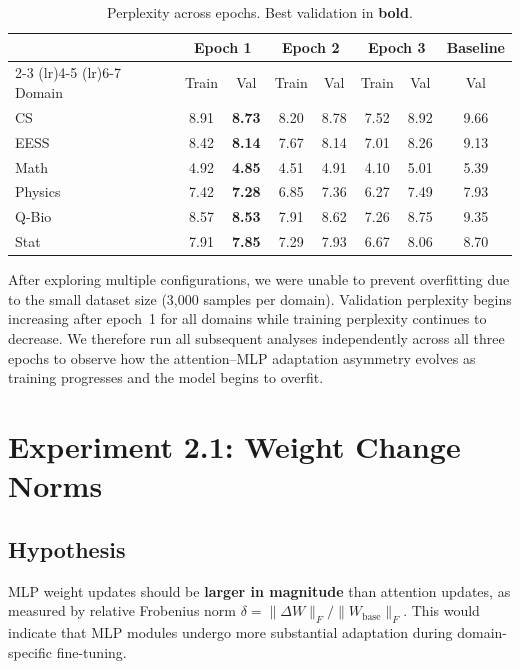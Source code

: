 \documentclass[11pt,a4paper]{article}
\begin{document}
\begin{table}[H]
\centering
\caption{Perplexity across epochs. Best validation in \textbf{bold}.}
\label{tab:perplexity}
\small
\begin{tabular}{l cc cc cc c}
\toprule
& \multicolumn{2}{c}{Epoch 1} & \multicolumn{2}{c}{Epoch 2} & \multicolumn{2}{c}{Epoch 3} & Baseline \\
\cmidrule(lr){2-3} \cmidrule(lr){4-5} \cmidrule(lr){6-7}
Domain & Train & Val & Train & Val & Train & Val & Val \\
\midrule
CS      & 8.91 & \textbf{8.73} & 8.20 & 8.78 & 7.52 & 8.92 & 9.66 \\
EESS    & 8.42 & \textbf{8.14} & 7.67 & 8.14 & 7.01 & 8.26 & 9.13 \\
Math    & 4.92 & \textbf{4.85} & 4.51 & 4.91 & 4.10 & 5.01 & 5.39 \\
Physics & 7.42 & \textbf{7.28} & 6.85 & 7.36 & 6.27 & 7.49 & 7.93 \\
Q-Bio   & 8.57 & \textbf{8.53} & 7.91 & 8.62 & 7.26 & 8.75 & 9.35 \\
Stat    & 7.91 & \textbf{7.85} & 7.29 & 7.93 & 6.67 & 8.06 & 8.70 \\
\bottomrule
\end{tabular}
\end{table}

After exploring multiple configurations, we were unable to prevent overfitting due to the small dataset size (3{,}000 samples per domain). Validation perplexity begins increasing after epoch~1 for all domains while training perplexity continues to decrease. We therefore run all subsequent analyses independently across all three epochs to observe how the attention--MLP adaptation asymmetry evolves as training progresses and the model begins to overfit.


\section{Experiment 2.1: Weight Change Norms}
\label{sec:wcn}

\subsection{Hypothesis}
MLP weight updates should be \textbf{larger in magnitude} than attention updates, as measured by relative Frobenius norm $\delta = \|\Delta W\|_F / \|W_{\text{base}}\|_F$. This would indicate that MLP modules undergo more substantial adaptation during domain-specific fine-tuning.
\end{document}
